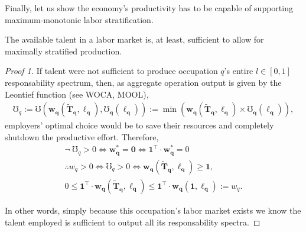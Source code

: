 \documentclass[hidelinks, nonatbib]{elsarticle}
\begin{document}
Finally, let us show the economy's productivity has to be capable of supporting maximum-monotonic labor stratification.
\begin{lemma}
    The available talent in a labor market is, at least, sufficient to allow for maximally stratified production.
    
    \begin{proof}[Proof 1]
        If talent were not sufficient to produce occupation $q$'s entire $l \in [0,1]$ responsability spectrum, then, as aggregate operation output is given by the Leontief function (see WOCA, MOOL),
        \begin{gather}
        \mho_q 
        := 
        \mho(
            \boldsymbol{w_{q}}(
                \boldsymbol{\tilde{T}_{q}},
                \boldsymbol{\ell_{q}}
            )
            ,
            \boldsymbol{\mho_q}(
                \boldsymbol{\ell_q}
            )
        )
        := 
        \min\left(
            \boldsymbol{w_{q}}(
                \boldsymbol{\tilde{T}_{q}},
                \boldsymbol{\ell_{q}}
            )
            \times
            \boldsymbol{\mho_q}(
                \boldsymbol{\ell_q}
            )
        \right)
        ,
        \end{gather}
        employers' optimal choice would be to save their resources and completely shutdown the productive effort. Therefore,
        \begin{gather}
        \lnot \
        \mho_q > 0
        \iff
        \boldsymbol{w_{q}^{*}} =
        \boldsymbol{0}
        \iff
        \boldsymbol{1} ^ {\top}
        \cdot
        \boldsymbol{w_{q}^{*}}
        =
        0
        \\
        \therefore
        w_q > 0
        \iff 
        \mho_q > 0
        \iff
        \boldsymbol{w_q}(
            \boldsymbol{\tilde{T}_q},
            \boldsymbol{\ell_q}
        )
        \geq
        \boldsymbol{1}
        ,
        \\
        0
        \leq
        \boldsymbol{1} ^ {\top}
        \cdot
        \boldsymbol{w_{q}}(
            \boldsymbol{\tilde{T}_{q}},
            \boldsymbol{\ell_{q}}
        )
        \leq
        \boldsymbol{1} ^ {\top}
        \cdot
        \boldsymbol{w_{q}}(
            \boldsymbol{1},
            \boldsymbol{\ell_{q}}
        )
        :=
        w_q
        .
        \end{gather}
        
        In other words, simply because this occupation's labor market exists we know the talent employed is sufficient to output all its responsability spectra.
        

\end{proof}
\end{lemma}
\end{document}

